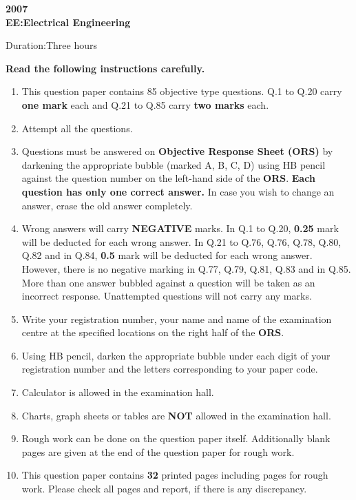 \documentclass[a4paper,10pt]{exam}
\theoremstyle{remark}
\begin{document}
\begin{center}
\textbf{2007\\EE:Electrical Engineering}
\end{center}
\vspace{0.5cm}
\raggedright{Duration:Three hours}
\hfill
{}
\vspace{0.98mm}
\begin{center}
    \textbf{Read the following instructions carefully.}
\end{center}
\begin{enumerate}
 \item This question paper contains 85 objective type questions. Q.1 to Q.20 carry \textbf{one mark} each and Q.21 to Q.85 carry \textbf{two marks} each.
\item Attempt all the questions.
    
    \item Questions must be answered on \textbf{Objective Response Sheet (ORS)} by darkening the appropriate bubble (marked A, B, C, D) using HB pencil against the question number on the left-hand side of the \textbf{ORS}. \textbf{Each question has only one correct answer.} In case you wish to change an answer, erase the old answer completely.
    
    \item Wrong answers will carry \textbf{NEGATIVE} marks. In Q.1 to Q.20, \textbf{0.25} mark will be deducted for each wrong answer. In Q.21 to Q.76, Q.76, Q.78, Q.80, Q.82 and in Q.84, \textbf{0.5} mark will be deducted for each wrong answer. However, there is no negative marking in Q.77, Q.79, Q.81, Q.83 and in Q.85. More than one answer bubbled against a question will be taken as an incorrect response. Unattempted questions will not carry any marks.
    
    \item Write your registration number, your name and name of the examination centre at the specified locations on the right half of the \textbf{ORS}.
    
    \item Using HB pencil, darken the appropriate bubble under each digit of your registration number and the letters corresponding to your paper code.
    
    \item Calculator is allowed in the examination hall.
    
    \item Charts, graph sheets or tables are \textbf{NOT} allowed in the examination hall.
    
    \item Rough work can be done on the question paper itself. Additionally blank pages are given at the end of the question paper for rough work.
    
    \item This question paper contains \textbf{32} printed pages including pages for rough work. Please check all pages and report, if there is any discrepancy.
\end{enumerate}
\end{document}
